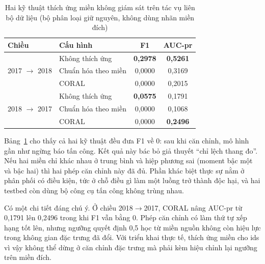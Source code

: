 \begin{table}[htbp]
\centering
\caption[Thích ứng miền không giám sát trên tác vụ liên bộ dữ liệu]{Hai kỹ thuật thích ứng miền không giám sát trên tác vụ liên bộ dữ liệu (bộ phân loại giữ nguyên, không dùng nhãn miền đích)}
\label{tab:cross_adapt}
\begin{tabular*}{\textwidth}{@{\extracolsep{\fill}}llcc@{}}
\toprule
\textbf{Chiều} & \textbf{Cấu hình} & \textbf{F1} & \textbf{AUC-\ac{pr}} \\ \midrule
\multirow{3}{*}{2017 $\rightarrow$ 2018} & Không thích ứng & \textbf{0{,}2978} & \textbf{0{,}5261} \\
 & Chuẩn hóa theo miền & 0{,}0000 & 0{,}3169 \\
 & CORAL & 0{,}0000 & 0{,}2015 \\ \midrule
\multirow{3}{*}{2018 $\rightarrow$ 2017} & Không thích ứng & \textbf{0{,}0575} & 0{,}1791 \\
 & Chuẩn hóa theo miền & 0{,}0000 & 0{,}1068 \\
 & CORAL & 0{,}0000 & \textbf{0{,}2496} \\ \bottomrule
\end{tabular*}
\end{table}

Bảng~\ref{tab:cross_adapt} cho thấy cả hai kỹ thuật đều đưa F1 về 0: sau khi căn chỉnh, mô hình gần như ngừng báo tấn công. Kết quả này bác bỏ giả thuyết ``chỉ lệch thang đo''. Nếu hai miền chỉ khác nhau ở trung bình và hiệp phương sai (moment bậc một và bậc hai) thì hai phép căn chỉnh này đã đủ. Phần khác biệt thực sự nằm ở phân phối có điều kiện, tức ở chỗ điều gì làm một luồng trở thành độc hại, và hai testbed còn dùng bộ công cụ tấn công không trùng nhau.

Có một chi tiết đáng chú ý. Ở chiều 2018$\rightarrow$2017, CORAL nâng AUC-\ac{pr} từ 0{,}1791 lên 0{,}2496 trong khi F1 vẫn bằng 0. Phép căn chỉnh có làm thứ tự xếp hạng tốt lên, nhưng ngưỡng quyết định 0{,}5 học từ miền nguồn không còn hiệu lực trong không gian đặc trưng đã đổi. Với triển khai thực tế, thích ứng miền cho \ac{ids} vì vậy không thể dừng ở căn chỉnh đặc trưng mà phải kèm hiệu chỉnh lại ngưỡng trên miền đích.

